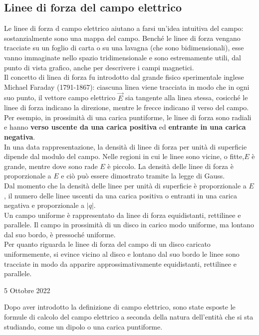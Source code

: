 \documentclass[a4paper]{extarticle}
\begin{document}
\subsection{Linee di forza del campo elettrico}
Le linee di forza d campo elettrico aiutano a farsi un'idea intuitiva del campo: sostanzialmente sono una mappa del campo. Benché le linee di forza vengano tracciate su un foglio di carta o su una lavagna (che sono bidimensionali), esse vanno immaginate nello spazio tridimensionale e sono estremamente utili, dal punto di vista grafico, anche per descrivere i campi magnetici.\\
Il concetto di linea di forza fu introdotto dal grande fisico sperimentale inglese Michael Faraday (1791-1867): ciascuna linea viene tracciata in modo che in ogni suo punto, il vettore campo elettrico $\vec E$ sia tangente alla linea stessa, cosicché le linee di forza indicano la direzione, mentre le frecce indicano il verso del campo.\\
Per esempio, in prossimità di una carica puntiforme, le linee di forza sono radiali e hanno \textbf{verso uscente da una carica positiva} ed \textbf{entrante in una carica negativa}.\\
In una data rappresentazione, la densità di linee di forza per unità di superficie dipende dal modulo del campo. Nelle regioni in cui le linee sono vicine, o fitte,$E$ è grande, mentre dove sono rade $E$ è piccolo. La densità delle linee di forza è proporzionale a $E$ e ciò può essere dimostrato tramite la legge di Gauss.\\
Dal momento che la densità delle linee per unità di superficie è proporzionale a $E$, il numero delle linee uscenti da una carica positiva o entranti in una carica negativa e proporzionale a $\vert q \vert$.\\
Un campo uniforme è rappresentato da linee di forza equidistanti, rettilinee e parallele. Il campo in prossimità di un disco in carico modo uniforme, ma lontano dal suo bordo, è pressoché uniforme.\\
Per quanto riguarda le linee di forza del campo di un disco caricato uniformemente, si evince vicino al disco e lontano dal suo bordo le linee sono tracciate in modo da apparire approssimativamente equidistanti, rettilinee e parallele.

\newpage
\noindent
\begin{center}
  5 Ottobre 2022
\end{center}
Dopo aver introdotto la definizione di campo elettrico, sono state esposte le formule di calcolo del campo elettrico a seconda della natura dell'entità che si sta studiando, come un dipolo o una carica puntiforme.
\end{document}
